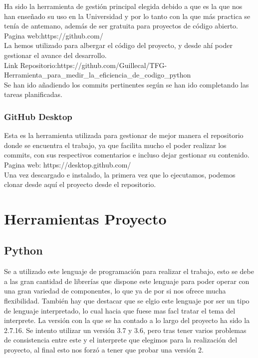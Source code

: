 Ha sido la herramienta de gestión principal elegida debido a que es la que nos han enseñado su uso en la Universidad y por lo tanto con la que más practica se tenía de antemano, además de ser gratuita para proyectos de código abierto.\\

Pagina web:https://github.com/ \\

La hemos utilizado para albergar el código del proyecto, y desde ahí poder gestionar el avance del desarrollo.\\

Link Repositorio:https://github.com/Guillecal/TFG-Herramienta_para_medir_la_eficiencia_de_codigo_python \\

Se han ido añadiendo los commits pertinentes según se han ido completando las tareas planificadas.

\subsubsection{GitHub Desktop}

Esta es la herramienta utilizada para gestionar de mejor manera el repositorio donde se encuentra el trabajo, ya que facilita mucho el poder realizar los commits, con sus respectivos comentarios e incluso dejar gestionar su contenido.\\

Pagina web: https://desktop.github.com/ \\

Una vez descargado e instalado, la primera vez que lo ejecutamos, podemos clonar desde aquí el proyecto desde el repositorio.


\section{Herramientas Proyecto}

\subsection{Python}

Se a utilizado este lenguaje de programación para realizar el trabajo, esto se debe a las gran cantidad de librerías que dispone este lenguaje para poder operar con una gran variedad de componentes, lo que ya de por si nos ofrece mucha flexibilidad. También hay que destacar que se elgio este lenguaje por ser un tipo de lenguaje interpretado, lo cual hacia que fuese mas facl tratar el tema del interprete.
La versión con la que se ha contado a lo largo del proyecto ha sido la 2.7.16. Se intento utilizar un versión 3.7 y 3.6, pero tras tener varios problemas de consistencia entre este y el interprete que elegimos para la realización del proyecto, al final esto nos forzó a tener que probar una versión 2.\\

